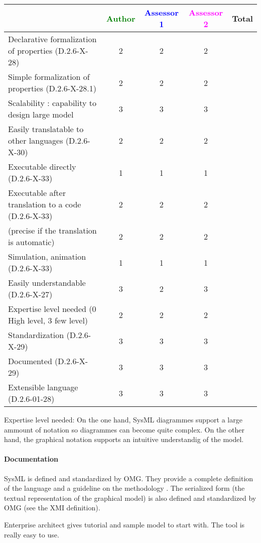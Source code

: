 \begin{tabular}{|l | c | c | c | c|}
\hline
& \textcolor{green}{Author} & \textcolor{blue}{Assessor 1} & \textcolor{magenta}{Assessor 2} & Total \\
\hline
Declarative formalization of properties (D.2.6-X-28) & 2 & 2 & 2 & \\
\hline
Simple formalization of properties (D.2.6-X-28.1) &2 &2 & 2& \\
\hline
Scalability : capability to design large model &3 &3 &3 & \\
\hline
Easily translatable to other languages (D.2.6-X-30) &2 &2 & 2& \\
\hline
Executable directly (D.2.6-X-33) &1 & 1& 1& \\
\hline
Executable after translation to a code (D.2.6-X-33) & 2 & 2& 2& \\
(precise if the translation is automatic) &2 & 2& 2& \\
\hline
Simulation, animation (D.2.6-X-33) &1 & 1& 1& \\
\hline
Easily understandable (D.2.6-X-27) &3 & 2& 3& \\
\hline
Expertise level needed (0 High level, 3 few level) &2 &2 & 2& \\
\hline
Standardization (D.2.6-X-29) &3 & 3& 3& \\
\hline
Documented (D.2.6-X-29) &3 & 3& 3& \\
\hline
Extensible language (D.2.6-01-28) &3 & 3& 3& \\
\hline
\end{tabular}
\begin{assessor2}
Expertise level needed: On the one hand, SysML diagrammes support a large ammount of notation so diagrammes can become quite complex. On the other hand, the graphical notation supports an intuitive understandig of the model.
\end{assessor2}

\paragraph{Documentation} 
SysML is  defined and standardized by OMG. They provide a complete
definition of the language and a guideline on the methodology
\cite{SysML}. The serialized form (the textual representation of the
graphical model) is also defined and standardized by OMG (see the XMI
definition).

Enterprise architect gives tutorial and sample model to start
with. The tool is really easy to use.

